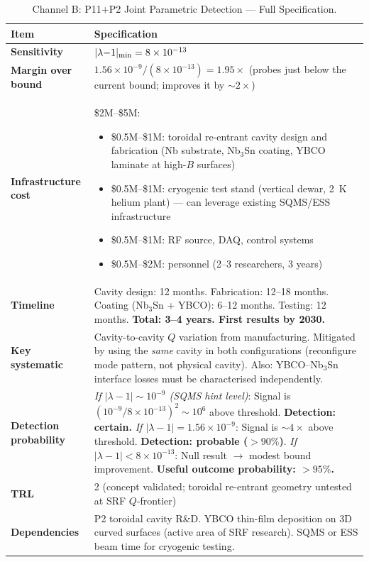 \documentclass[11pt]{article}
\newcommand{\ee}[1]{\times 10^{#1}}
\newcommand{\lamdiff}{|\lambda{-}1|}
\newcommand{\lambdabound}{1.56\ee{-9}}
\begin{document}
\begin{table}[H]
\centering
\caption{Channel B: P11+P2 Joint Parametric Detection --- Full Specification.}
\label{tab:channel-B}
\begin{tabular}{p{4cm}p{8cm}}
\toprule
\textbf{Item} & \textbf{Specification} \\
\midrule
\textbf{Sensitivity} & $\lamdiff_{\rm min} = 8\ee{-13}$ \\
\textbf{Margin over bound} & $\lambdabound/(8\ee{-13}) = 1.95\times$
  (probes just below the current bound; improves it by $\sim 2\times$) \\
\textbf{Infrastructure cost} & \$2M--\$5M:
  \begin{itemize}[nosep]
  \item \$0.5M--\$1M: toroidal re-entrant cavity design and fabrication
    (Nb substrate, Nb$_3$Sn coating, YBCO laminate at high-$B$ surfaces)
  \item \$0.5M--\$1M: cryogenic test stand (vertical dewar, 2~K helium plant)
    --- can leverage existing SQMS/ESS infrastructure
  \item \$0.5M--\$1M: RF source, DAQ, control systems
  \item \$0.5M--\$2M: personnel (2--3 researchers, 3 years)
  \end{itemize} \\
\textbf{Timeline} & Cavity design: 12 months. Fabrication: 12--18 months.
  Coating (Nb$_3$Sn + YBCO): 6--12 months. Testing: 12 months.
  \textbf{Total: 3--4 years. First results by 2030.} \\
\textbf{Key systematic} & Cavity-to-cavity $Q$ variation from manufacturing.
  Mitigated by using the \emph{same} cavity in both configurations
  (reconfigure mode pattern, not physical cavity). Also: YBCO--Nb$_3$Sn
  interface losses must be characterised independently. \\
\textbf{Detection probability} &
  \textit{If $\lamdiff \sim 10^{-9}$ (SQMS hint level)}: Signal is
  $(10^{-9}/8\ee{-13})^2 \sim 10^6$ above threshold.
  \textbf{Detection: certain.}
  \textit{If $\lamdiff = \lambdabound$}: Signal is $\sim 4\times$ above
  threshold. \textbf{Detection: probable ($>90\%$)}.
  \textit{If $\lamdiff < 8\ee{-13}$}: Null result $\to$ modest bound
  improvement.
  \textbf{Useful outcome probability: $>95\%$.} \\
\textbf{TRL} & 2 (concept validated; toroidal re-entrant geometry untested
  at SRF $Q$-frontier) \\
\textbf{Dependencies} & P2 toroidal cavity R\&D. YBCO thin-film deposition
  on 3D curved surfaces (active area of SRF research). SQMS or ESS beam
  time for cryogenic testing. \\
\bottomrule
\end{tabular}
\end{table}
\end{document}
